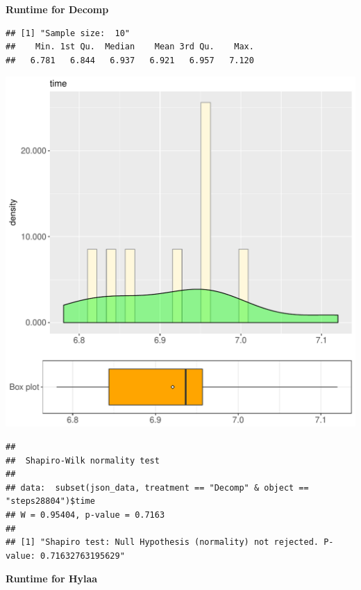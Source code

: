 \documentclass{article}\usepackage[]{graphicx}\usepackage[]{color}
\makeatletter
\def\maxwidth{ %
  \ifdim\Gin@nat@width>\linewidth
    \linewidth
  \else
    \Gin@nat@width
  \fi
}
\newenvironment{kframe}{%
 \def\at@end@of@kframe{}%
 \ifinner\ifhmode%
  \def\at@end@of@kframe{\end{minipage}}%
  \begin{minipage}{\columnwidth}%
 \fi\fi%
 \def\FrameCommand##1{\hskip\@totalleftmargin \hskip-\fboxsep
 \colorbox{shadecolor}{##1}\hskip-\fboxsep
     \hskip-\linewidth \hskip-\@totalleftmargin \hskip\columnwidth}%
 \MakeFramed {\advance\hsize-\width
   \@totalleftmargin\z@ \linewidth\hsize
   \@setminipage}}%
 {\par\unskip\endMakeFramed%
 \at@end@of@kframe}
\newenvironment{knitrout}{}{} %
\makeatother
\begin{document}
 \textbf{Runtime for Decomp}
\begin{knitrout}
\color{fgcolor}\begin{kframe}
\begin{verbatim}
## [1] "Sample size:  10"
##    Min. 1st Qu.  Median    Mean 3rd Qu.    Max. 
##   6.781   6.844   6.937   6.921   6.957   7.120
\end{verbatim}
\end{kframe}
\includegraphics[width=\maxwidth]{figure/RH2_Decomp_steps28804-1} 
\begin{kframe}\begin{verbatim}
## 
## 	Shapiro-Wilk normality test
## 
## data:  subset(json_data, treatment == "Decomp" & object == "steps28804")$time
## W = 0.95404, p-value = 0.7163
## 
## [1] "Shapiro test: Null Hypothesis (normality) not rejected. P-value: 0.71632763195629"
\end{verbatim}
\end{kframe}
\end{knitrout}
 \textbf{Runtime for Hylaa}
\end{document}
